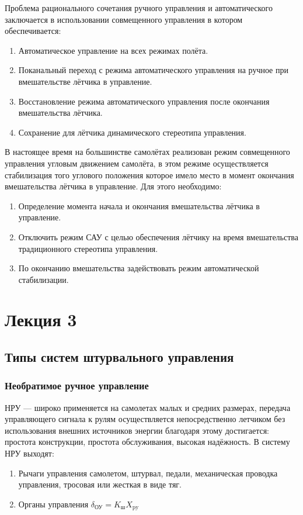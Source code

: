\documentclass{article}
\begin{document}
Проблема рационального сочетания ручного управления и автоматического
заключается в использовании совмещенного управления в котором обеспечивается:
\begin{enumerate}
	\item Автоматическое управление на всех режимах полёта.
	\item Поканальный переход с режима автоматического управления на ручное при
	      вмешательстве лётчика в управление.
	\item Восстановление режима автоматического управления после окончания
	      вмешательства лётчика.
	\item Сохранение для лётчика динамического стереотипа управления.
\end{enumerate}
В настоящее время на большинстве самолётах реализован режим совмещенного
управления угловым движением самолёта, в этом режиме осуществляется
стабилизация того углового положения которое имело место в момент окончания
вмешательства лётчика в управление.
Для этого необходимо:
\begin{enumerate}
	\item Определение момента начала и окончания вмешательства лётчика в
	      управление.
	\item Отключить режим САУ с целью обеспечения лётчику на время
	      вмешательства традиционного стереотипа управления.
	\item По окончанию вмешательства задействовать режим автоматической
	      стабилизации.
\end{enumerate}
\newpage

\section{Лекция 3}
\subsection{Типы систем штурвального управления}
\subsubsection{Необратимое ручное управление}
НРУ --- широко применяется на самолетах малых и средних размерах, передача
управляющего сигнала к рулям осуществляется непосредственно летчиком без
использования внешних источников энергии благодаря этому достигается: простота
конструкции, простота обслуживания, высокая надёжность.
В систему НРУ выходят:
\begin{enumerate}
	\item Рычаги управления самолетом, штурвал, педали, механическая проводка
	      управления, тросовая или жесткая в виде тяг.
	\item Органы управления $\delta_\text{ОУ} = K_\text{ш} X_\text{py}$
\end{enumerate}
\end{document}
